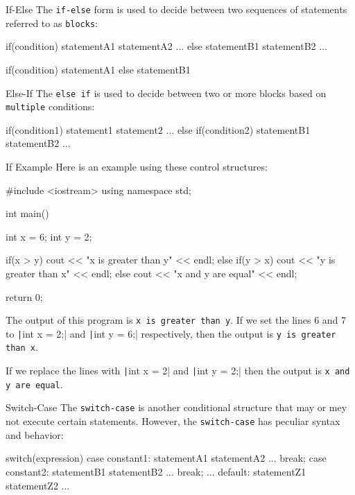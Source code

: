 \documentclass[../lecture3-flowofcontrol.tex]{subfiles}
\begin{document}
\begin{frame}[fragile]{If-Else}
    The \verb|if-else| form is used to decide between two sequences of statements referred to as \verb|blocks|:
\begin{cppcode}[]
if(condition)
{
    statementA1
    statementA2
    ...
}
else
{
    statementB1
    statementB2
    ...
}
\end{cppcode}

\begin{cppcode}[]
if(condition)
    statementA1
else
    statementB1
\end{cppcode}
\end{frame}

\begin{frame}[fragile]{Else-If}
    The \verb|else if| is used to decide between two or more blocks based on \verb|multiple| conditions:
\begin{cppcode}[]
if(condition1)
{
    statement1
    statement2
    ...
}
else if(condition2)
{
    statementB1
    statementB2
    ...
}
\end{cppcode}
\end{frame}

\begin{frame}[fragile]{If Example}
    Here is an example using these control structures:
\begin{cppcode}[]
#include <iostream>
using namespace std;

int main()
{
    int x = 6;
    int y = 2;

    if(x > y)
        cout << "x is greater than y" << endl;
    else if(y > x)
        cout << "y is greater than x" << endl;
    else
        cout << "x and y are equal" << endl;

    return 0;
}
\end{cppcode}

    The output of this program is \verb|x is greater than y|. If we set the lines 6 and 7 to \texttt|int x = 2;| and \texttt|int y = 6;| respectively, then the output is \verb|y is greater than x|. \newline

    If we replace the lines with \texttt|int x = 2| and \texttt|int y = 2;| then the output is \verb|x and y are equal|.
\end{frame}


\begin{frame}[fragile]{Switch-Case}
    The \verb|switch-case| is another conditional structure that may or mey not execute certain statements. However, the \verb|switch-case| has peculiar syntax and behavior:

\begin{cppcode}[]
switch(expression)
{
    case constant1:
            statementA1
            statementA2
            ...
            break;
    case constant2:
            statementB1
            statementB2
            ...
            break;
    ...
    default:
            statementZ1
            statementZ2
            ...
}
\end{cppcode}
\end{frame}
\end{document}
